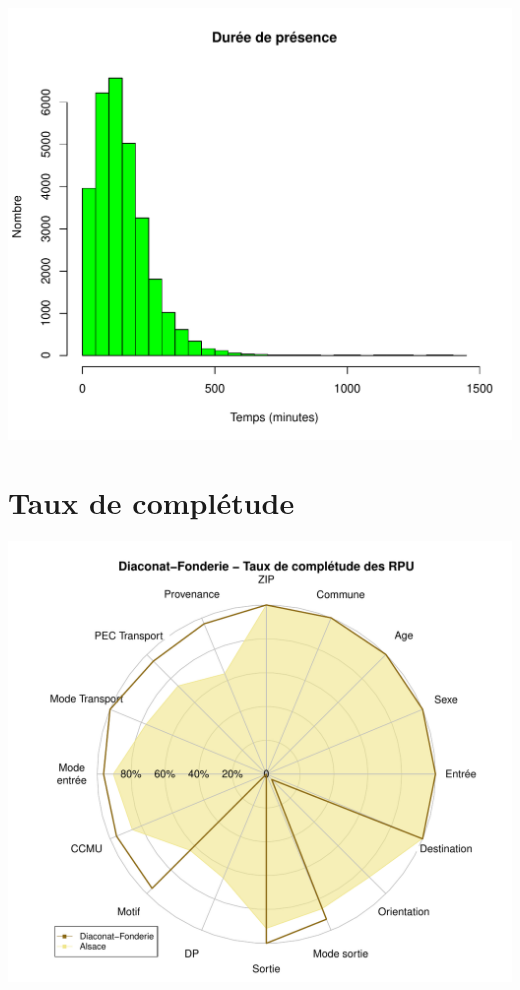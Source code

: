 \documentclass[12pt,english,french,twoside]{book}\usepackage[]{graphicx}\usepackage[]{color}
\makeatletter
\def\maxwidth{ %
  \ifdim\Gin@nat@width>\linewidth
    \linewidth
  \else
    \Gin@nat@width
  \fi
}
\newenvironment{knitrout}{}{} %
\makeatother
\begin{document}
\begin{knitrout}
\color{fgcolor}
\includegraphics[width=\maxwidth]{figure/graphe_fonderie-1} 

\end{knitrout}

\section*{Taux de complétude}

\begin{knitrout}
\color{fgcolor}
\includegraphics[width=\maxwidth]{figure/compl_dia-1} 

\end{knitrout}
\end{document}
